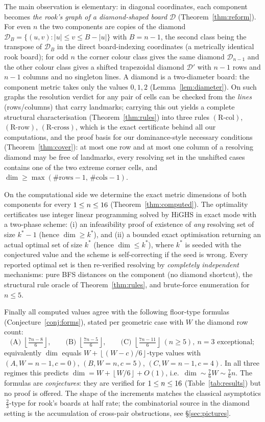 \documentclass[12pt]{article}
\theoremstyle{definition}
\newcommand{\DD}{\mathcal{D}}
\newcommand{\DDs}{\mathcal{D}'}
\newcommand{\floor}[1]{\left\lfloor #1 \right\rfloor}
\newcommand{\RRc}{\ensuremath{\mathrm{(R\text{-}col)}}}
\newcommand{\RRr}{\ensuremath{\mathrm{(R\text{-}row)}}}
\newcommand{\RRx}{\ensuremath{\mathrm{(R\text{-}cross)}}}
\begin{document}
The main observation is elementary: in diagonal coordinates, each component becomes \emph{the rook's graph of a diamond-shaped board} $\DD$ (Theorem~\ref{thm:reform}). For even $n$ the two components are copies of the diamond $\DD_B=\{(u,v):|u|\le v\le B-|u|\}$ with $B=n-1$, the second class being the transpose of $\DD_B$ in the direct board-indexing coordinates (a metrically identical rook board); for odd $n$ the corner colour class gives the same diamond $\DD_{n-1}$ and the other colour class gives a shifted trapezoidal diamond $\DDs$ with $n-1$ rows and $n-1$ columns and no singleton lines. A diamond is a two-diameter board: the component metric takes only the values $0,1,2$ (Lemma~\ref{lem:diameter}). On such graphs the resolution verdict for any pair of cells can be checked from the \emph{lines} (rows/columns) that carry landmarks; carrying this out yields a complete structural characterisation (Theorem~\ref{thm:rules}) into three rules \RRc, \RRr, \RRx, which is the exact certificate behind all our computations, and the proof basis for our dominance-style necessary conditions (Theorem~\ref{thm:cover}): at most one row and at most one column of a resolving diamond may be free of landmarks, every resolving set in the unshifted cases contains one of the two extreme corner cells, and $\dim\ge\max(\#\text{rows}-1,\,\#\text{cols}-1)$.

On the computational side we determine the exact metric dimensions of both components for every $1\le n\le 16$ (Theorem~\ref{thm:computed}). The optimality certificates use integer linear programming solved by HiGHS in exact mode with a two-phase scheme: (i) an infeasibility proof of existence of \emph{any} resolving set of size $k^\ast-1$ (hence $\dim\ge k^\ast$), and (ii) a bounded exact optimisation returning an actual optimal set of size $k^\ast$ (hence $\dim\le k^\ast$), where $k^\ast$ is seeded with the conjectured value and the scheme is self-correcting if the seed is wrong. Every reported optimal set is then re-verified resolving by \emph{completely independent} mechanisms: pure BFS distances on the component (no diamond shortcut), the structural rule oracle of Theorem~\ref{thm:rules}, and brute-force enumeration for $n\le 5$.

Finally all computed values agree with the following floor-type formulas (Conjecture~\ref{conj:forms}), stated per geometric case with $W$ the diamond row count:
\[
\text{(A) } \floor{\tfrac{7n-8}{6}},\qquad
\text{(B) } \floor{\tfrac{7n-5}{6}},\qquad
\text{(C) } \floor{\tfrac{7n-11}{6}}\ (n\ge 5),\ n=3\text{ exceptional};
\]
equivalently $\dim$ equals $W+\floor{(W-c)/6}$-type values with $(A,W=n-1,c=0)$, $(B,W=n,c=5)$, $(C,W=n-1,c=4)$. In all three regimes this predicts $\dim = W + \floor{W/6} + O(1)$, i.e.\ $\dim\sim \tfrac76 W \sim \tfrac76 n$. The formulas are \emph{conjectures}: they are verified for $1\le n\le16$ (Table~\ref{tab:results}) but no proof is offered. The shape of the increments matches the classical asymptotics $~\tfrac23$-type for rook's boards \cite{caceres2007,baileycameron2011} at half rate; the combinatorial source in the diamond setting is the accumulation of cross-pair obstructions, see \S\ref{sec:pictures}.
\end{document}

